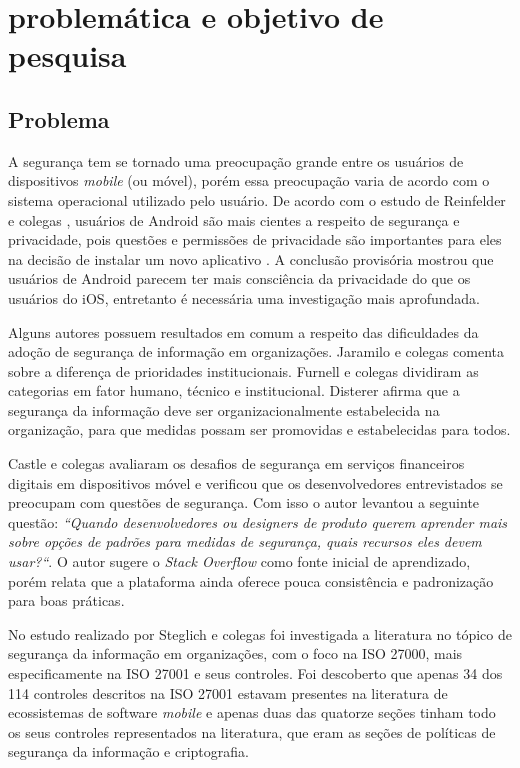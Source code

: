\chapter{\label{chap:intro}problemática e objetivo de pesquisa}


\section{Problema}

A segurança tem se tornado uma preocupação grande entre os usuários de dispositivos \textit{mobile} (ou móvel), porém essa preocupação varia de acordo com o sistema operacional utilizado pelo usuário. De acordo com o estudo de Reinfelder e colegas \cite{reinfelder2014differences}, usuários de Android são mais cientes a respeito de segurança e  privacidade, pois questões e permissões de privacidade são importantes para eles na decisão de instalar um novo aplicativo . A conclusão provisória mostrou que usuários de Android parecem ter mais consciência da privacidade do que os usuários do iOS, entretanto é necessária uma investigação mais aprofundada.


Alguns autores possuem resultados em comum a respeito das dificuldades da adoção de segurança de informação em organizações. Jaramilo e colegas \cite{jaramillo2013cross} comenta sobre a diferença de prioridades institucionais. Furnell e colegas \cite{furnell2009integrated} dividiram as categorias em fator humano, técnico e institucional. Disterer \cite{disterer2013} afirma que a segurança da informação deve ser organizacionalmente estabelecida na organização, para que medidas possam ser promovidas e estabelecidas para todos.


Castle e colegas \cite{castle2016let} avaliaram os desafios de segurança em serviços financeiros digitais em dispositivos móvel e verificou que os desenvolvedores entrevistados se preocupam com questões de segurança. Com isso o autor levantou a seguinte questão: \textit{“Quando desenvolvedores ou designers de produto querem aprender mais sobre opções de padrões para medidas de segurança, quais recursos eles devem usar?“}. O autor sugere o \textit{Stack Overflow} como fonte inicial de aprendizado, porém relata que a plataforma ainda oferece pouca consistência e padronização para boas práticas.

No estudo realizado por Steglich e colegas  \cite{caio2019} foi investigada a literatura no tópico de segurança da informação em organizações, com o foco na ISO 27000, mais especificamente na ISO 27001 e seus controles. Foi descoberto que apenas 34 dos 114 controles descritos na ISO 27001 estavam presentes na literatura de ecossistemas de software \textit{mobile} e apenas duas das quatorze seções tinham todo os seus controles representados na literatura, que eram as seções de políticas de segurança da informação e criptografia.  

